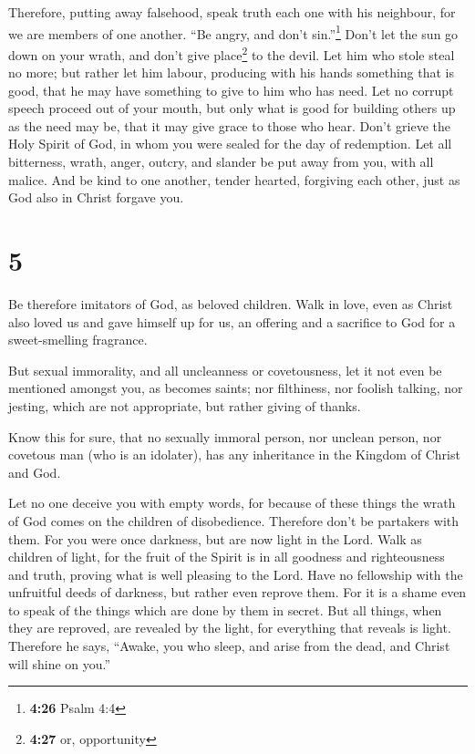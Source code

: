  Therefore, putting away falsehood, speak truth each one
with his neighbour, for we are members of one another. 
``Be angry, and don't sin.''\footnote{\textbf{4:26} Psalm 4:4} Don't let
the sun go down on your wrath,  and don't give
place\footnote{\textbf{4:27} or, opportunity} to the devil.
 Let him who stole steal no more; but rather let him
labour, producing with his hands something that is good, that he may
have something to give to him who has need.  Let no
corrupt speech proceed out of your mouth, but only what is good for
building others up as the need may be, that it may give grace to those
who hear.  Don't grieve the Holy Spirit of God, in whom
you were sealed for the day of redemption.  Let all
bitterness, wrath, anger, outcry, and slander be put away from you, with
all malice.  And be kind to one another, tender hearted,
forgiving each other, just as God also in Christ forgave you.

\hypertarget{section-4}{%
\section{5}\label{section-4}}

 Be therefore imitators of God, as beloved children.
 Walk in love, even as Christ also loved us and gave
himself up for us, an offering and a sacrifice to God for a
sweet-smelling fragrance.

 But sexual immorality, and all uncleanness or
covetousness, let it not even be mentioned amongst you, as becomes
saints;  nor filthiness, nor foolish talking, nor jesting,
which are not appropriate, but rather giving of thanks.

 Know this for sure, that no sexually immoral person, nor
unclean person, nor covetous man (who is an idolater), has any
inheritance in the Kingdom of Christ and God.

 Let no one deceive you with empty words, for because of
these things the wrath of God comes on the children of disobedience.
 Therefore don't be partakers with them. 
For you were once darkness, but are now light in the Lord. Walk as
children of light,  for the fruit of the Spirit is in all
goodness and righteousness and truth,  proving what is
well pleasing to the Lord.  Have no fellowship with the
unfruitful deeds of darkness, but rather even reprove them.
 For it is a shame even to speak of the things which are
done by them in secret.  But all things, when they are
reproved, are revealed by the light, for everything that reveals is
light.  Therefore he says, ``Awake, you who sleep, and
arise from the dead, and Christ will shine on you.''

